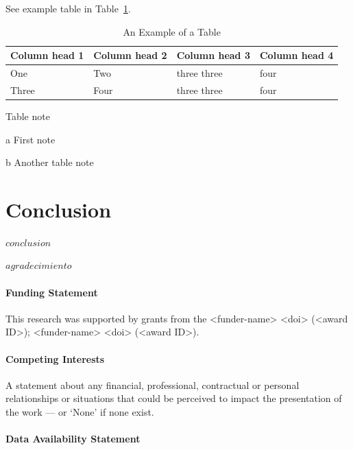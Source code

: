 \documentclass[
  journal=large,
  manuscript=propuesta,
  year=2020,
  volume=37,
]{cup-journal}
\begin{document}
See example table in Table~\ref{table_example}.

\begin{table}[hbt!]
\begin{threeparttable}
\caption{An Example of a Table}
\label{table_example}
\begin{tabular}{llll}
\toprule
\headrow Column head 1 & Column head 2  & Column head 3 & Column head 4\\
\midrule
One\tnote{a} & Two&three three &four\\ 
\midrule
Three & Four&three three\tnote{b} &four\\
\bottomrule
\end{tabular}
\begin{tablenotes}[hang]
\item[]Table note
\item[a]First note
\item[b]Another table note
\end{tablenotes}
\end{threeparttable}
\end{table}


\section{Conclusion}
$conclusion$


\begin{acknowledgement}
$agradecimiento$
\end{acknowledgement}

\paragraph{Funding Statement}

This research was supported by grants from the <funder-name> <doi> (<award ID>); <funder-name> <doi> (<award ID>).

\paragraph{Competing Interests}

A statement about any financial, professional, contractual or personal relationships or situations that could be perceived to impact the presentation of the work --- or `None' if none exist.

\paragraph{Data Availability Statement}
\end{document}
